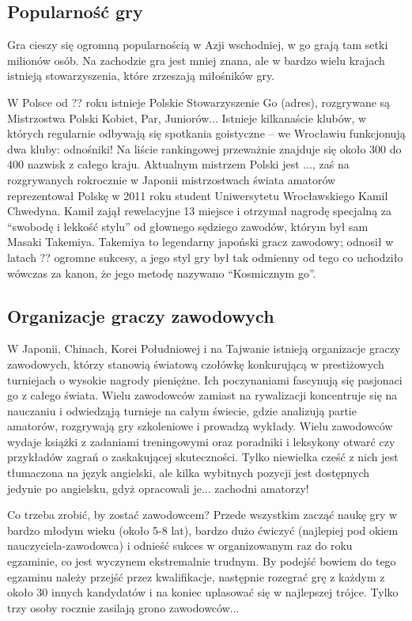 \documentclass[11pt,leqno]{article}
\begin{document}
\subsection{Popularność gry }

Gra cieszy się ogromną popularnością w Azji wschodniej, w go grają tam setki milionów osób. Na zachodzie gra jest mniej znana, 
ale w bardzo wielu krajach istnieją stowarzyszenia, które zrzeszają miłośników gry. 

W Polsce od ?? roku istnieje Polskie Stowarzyszenie
Go (adres), rozgrywane są Mistrzostwa Polski Kobiet, Par, Juniorów... Istnieje kilkanaście klubów, w których regularnie odbywają
się spotkania goistyczne -- we Wrocławiu funkcjonują dwa kluby: odnośniki! Na liście rankingowej przeważnie znajduje się około 300 do 400 
nazwisk z całego kraju. Aktualnym mistrzem Polski jest ..., zaś na rozgrywanych rokrocznie w Japonii mistrzostwach świata amatorów 
reprezentował Polskę w 2011 roku student Uniwersytetu Wrocławskiego Kamil Chwedyna. 
Kamil zajął rewelacyjne 13 miejsce i otrzymał nagrodę specjalną za 
``swobodę i lekkość stylu'' od głownego sędziego zawodów, którym był sam Masaki Takemiya. 
Takemiya to legendarny japoński gracz zawodowy; odnosił w latach ?? ogromne sukcesy, a jego styl
gry był tak odmienny od tego co uchodziło wówczas za kanon, że jego metodę nazywano ``Kosmicznym go''.

\subsection{Organizacje graczy zawodowych}
W Japonii, Chinach, Korei Południowej i na Tajwanie istnieją organizacje graczy zawodowych, którzy stanowią światową czołówkę konkurującą w 
prestiżowych turniejach o wysokie nagrody pieniężne. Ich poczynaniami fascynują się pasjonaci go z całego świata. Wielu
 zawodowców zamiast na rywalizacji koncentruje się na nauczaniu i odwiedząją turnieje na całym świecie, gdzie analizują 
partie amatorów, rozgrywają gry szkoleniowe i prowadzą wykłady. Wielu zawodowców  wydaje książki z zadaniami treningowymi
 oraz poradniki i leksykony otwarć czy przykładów zagrań o zaskakującej skuteczności. Tylko niewielka cześć z nich jest 
tłumaczona na język angielski, ale kilka wybitnych pozycji jest dostępnych jedynie po angielsku, gdyż opracowali je... zachodni amatorzy!

Co trzeba zrobić, by zostać zawodowcem? Przede wszystkim zacząć naukę gry w bardzo młodym wieku (około 5-8 lat), 
bardzo dużo ćwiczyć (najlepiej pod okiem nauczyciela-zawodowca) i odnieść sukces w organizowanym raz do roku egzaminie, 
co jest wyczynem ekstremalnie trudnym. By podejść bowiem do tego egzaminu należy przejść przez kwalifikacje, następnie 
rozegrać grę z każdym z około 30 innych kandydatów i na koniec uplasować się w najlepszej trójce. Tylko trzy osoby rocznie 
zasilają grono zawodowców...
\end{document}
